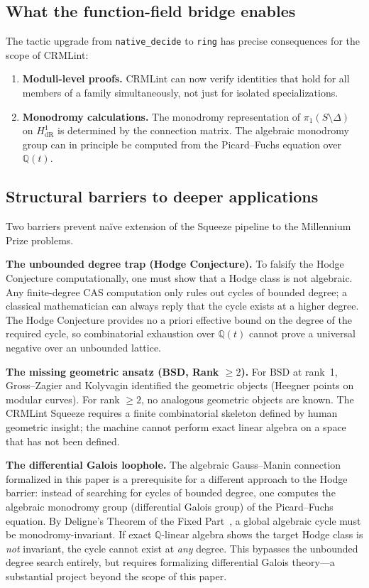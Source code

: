 \documentclass[11pt]{article}
\theoremstyle{plain}
\theoremstyle{definition}
\theoremstyle{remark}
\newcommand{\Q}{\mathbb{Q}}
\newcommand{\HdR}{H^1_{\mathrm{dR}}}
\begin{document}
\subsection{What the function-field bridge enables}

The tactic upgrade from \texttt{native\_decide} to \texttt{ring}
has precise consequences for the scope of CRMLint:

\begin{enumerate}[nosep]
\item \textbf{Moduli-level proofs.}  CRMLint can now verify
  identities that hold for all members of a family simultaneously,
  not just for isolated specializations.
\item \textbf{Monodromy calculations.}  The monodromy representation
  of $\pi_1(S \setminus \Delta)$ on $\HdR$ is determined by the
  connection matrix.  The algebraic monodromy group can in principle be
  computed from the Picard--Fuchs equation over~$\Q(t)$.
\end{enumerate}

\subsection{Structural barriers to deeper applications}

Two barriers prevent na\"ive extension of the Squeeze pipeline to
the Millennium Prize problems.

\textbf{The unbounded degree trap (Hodge Conjecture).}
To falsify the Hodge Conjecture computationally, one must show that
a Hodge class is not algebraic.  Any finite-degree CAS computation
only rules out cycles of bounded degree; a classical mathematician
can always reply that the cycle exists at a higher degree.  The Hodge
Conjecture provides no a priori effective bound on the degree of the
required cycle, so combinatorial exhaustion over $\Q(t)$ cannot prove
a universal negative over an unbounded lattice.

\textbf{The missing geometric ansatz (BSD, Rank $\geq 2$).}
For BSD at rank~1, Gross--Zagier and Kolyvagin identified the
geometric objects (Heegner points on modular curves).  For rank
$\geq 2$, no analogous geometric objects are known.  The CRMLint
Squeeze requires a finite combinatorial skeleton defined by human
geometric insight; the machine cannot perform exact linear algebra
on a space that has not been defined.

\textbf{The differential Galois loophole.}  The algebraic
Gauss--Manin connection formalized in this paper is a prerequisite
for a different approach to the Hodge barrier: instead of searching
for cycles of bounded degree, one computes the algebraic monodromy
group (differential Galois group) of the Picard--Fuchs equation.
By Deligne's Theorem of the Fixed Part~\cite{Deligne1982}, a global algebraic cycle
must be monodromy-invariant.  If exact $\Q$-linear algebra shows the
target Hodge class is \emph{not} invariant, the cycle cannot exist
at \emph{any} degree.  This bypasses the unbounded degree search
entirely, but requires formalizing differential Galois theory---a
substantial project beyond the scope of this paper.
\end{document}

